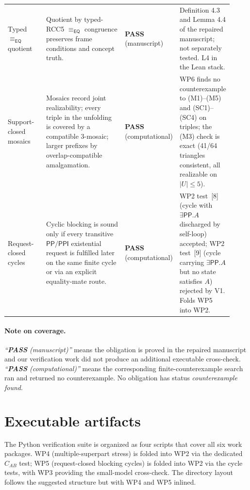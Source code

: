 \documentclass[11pt]{article}
\newcommand{\EQ}{\mathsf{EQ}}
\newcommand{\PP}{\mathsf{PP}}
\newcommand{\PPI}{\mathsf{PPI}}
\newcommand{\eqrel}{\equiv_{\EQ}}
\newcommand{\PASS}{\textcolor{black!70!green}{\textbf{PASS}}}
\begin{document}
\begin{center}
\begin{longtable}{p{0.18\linewidth} p{0.40\linewidth} p{0.13\linewidth} p{0.21\linewidth}}
Typed \(\eqrel\) quotient
  & Quotient by typed-RCC5 \(\eqrel\) congruence preserves frame
    conditions and concept truth.
  & \PASS{} (manuscript)
  & Definition 4.3 and Lemma 4.4 of the repaired manuscript; not
    separately tested.  L4 in the Lean stack. \\

Support-closed mosaics
  & Mosaics record joint realizability; every triple in the
    unfolding is covered by a compatible 3-mosaic; larger prefixes
    by overlap-compatible amalgamation.
  & \PASS{} (computational)
  & WP6 finds no counterexample to (M1)--(M5) and (SC1)--(SC4) on
    triples; the (M3) check is exact (41/64 triangles
    consistent, all realizable on \(|U|\le 5\)). \\

Request-closed cycles
  & Cyclic blocking is sound only if every transitive
    \(\PP/\PPI\) existential request is fulfilled later on the
    same finite cycle or via an explicit equality-mate route.
  & \PASS{} (computational)
  & WP2 test~[8] (cycle with \(\exists\PP.A\) discharged by
    self-loop) accepted; WP2 test~[9] (cycle carrying
    \(\exists\PP.A\) but no state satisfies \(A\)) rejected by V1.
    Folds WP5 into WP2. \\

\end{longtable}
\end{center}

\paragraph{Note on coverage.}
\emph{``\PASS{} (manuscript)''} means the obligation is proved in
the repaired manuscript and our verification work did not produce
an additional executable cross-check.  \emph{``\PASS{}
(computational)''} means the corresponding finite-counterexample
search ran and returned no counterexample.  No obligation has
status \emph{counterexample found}.

\section{Executable artifacts}

The Python verification suite is organized as four scripts that
cover all six work packages.  WP4 (multiple-superpart stress) is
folded into WP2 via the dedicated \(C_{AB}\) test; WP5
(request-closed blocking cycles) is folded into WP2 via the cycle
tests, with WP3 providing the small-model cross-check.  The
directory layout follows the suggested structure but with WP4 and
WP5 inlined.
\end{document}
